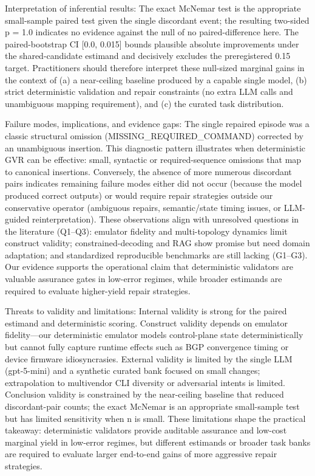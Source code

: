 \documentclass[conference]{IEEEtran}
\begin{document}
Interpretation of inferential results: The exact McNemar test is the appropriate small-sample paired test given the single discordant event; the resulting two-sided p = 1.0 indicates no evidence against the null of no paired-difference here. The paired-bootstrap CI [0.0, 0.015] bounds plausible absolute improvements under the shared-candidate estimand and decisively excludes the preregistered 0.15 target. Practitioners should therefore interpret these null-sized marginal gains in the context of (a) a near-ceiling baseline produced by a capable single model, (b) strict deterministic validation and repair constraints (no extra LLM calls and unambiguous mapping requirement), and (c) the curated task distribution.

Failure modes, implications, and evidence gaps: The single repaired episode was a classic structural omission (MISSING\_REQUIRED\_COMMAND) corrected by an unambiguous insertion. This diagnostic pattern illustrates when deterministic GVR can be effective: small, syntactic or required-sequence omissions that map to canonical insertions. Conversely, the absence of more numerous discordant pairs indicates remaining failure modes either did not occur (because the model produced correct outputs) or would require repair strategies outside our conservative operator (ambiguous repairs, semantic/state timing issues, or LLM-guided reinterpretation). These observations align with unresolved questions in the literature (Q1--Q3): emulator fidelity and multi-topology dynamics limit construct validity; constrained-decoding and RAG show promise but need domain adaptation; and standardized reproducible benchmarks are still lacking (G1--G3). Our evidence supports the operational claim that deterministic validators are valuable assurance gates in low-error regimes, while broader estimands are required to evaluate higher-yield repair strategies.

Threats to validity and limitations: Internal validity is strong for the paired estimand and deterministic scoring. Construct validity depends on emulator fidelity---our deterministic emulator models control-plane state deterministically but cannot fully capture runtime effects such as BGP convergence timing or device firmware idiosyncrasies. External validity is limited by the single LLM (gpt-5-mini) and a synthetic curated bank focused on small changes; extrapolation to multivendor CLI diversity or adversarial intents is limited. Conclusion validity is constrained by the near-ceiling baseline that reduced discordant-pair counts; the exact McNemar is an appropriate small-sample test but has limited sensitivity when n is small. These limitations shape the practical takeaway: deterministic validators provide auditable assurance and low-cost marginal yield in low-error regimes, but different estimands or broader task banks are required to evaluate larger end-to-end gains of more aggressive repair strategies.
\end{document}
